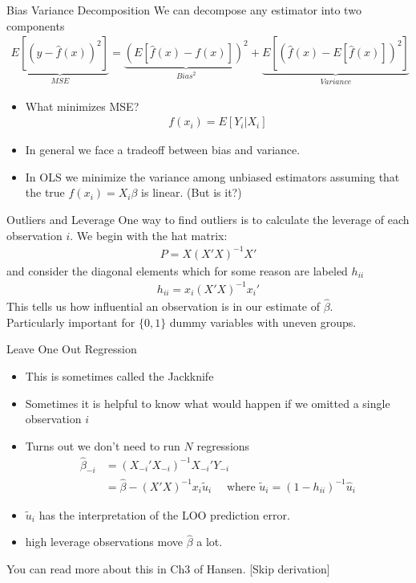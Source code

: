 \documentclass[aspectratio=169]{beamer}
\begin{document}
\begin{frame}{Bias Variance Decomposition}
We can decompose any estimator into two components
\begin{eqnarray*}
\underbrace{E[(y- \hat{f}(x))^2]}_{MSE} =\underbrace{\left( E[ \hat{f}(x) - f(x)] \right)^2}_{Bias^2}  +  \underbrace{E \left[ \left(  \hat{f}(x) - E[\hat{f}(x)]  \right)^2 \right]}_{Variance} 
\end{eqnarray*}
\begin{itemize}
\item What minimizes MSE?
\begin{eqnarray*}
f(x_i) = E[Y_i | X_i]  
\end{eqnarray*}
\item In general we face a tradeoff between bias and variance.
\item In OLS we minimize the variance among unbiased estimators assuming that the true $f(x_i)= X_i \beta$ is linear. (But is it?)
\end{itemize}
\end{frame}



\begin{frame}{Outliers and Leverage}
One way to find \alert{outliers} is to calculate the \alert{leverage} of each observation $i$. We begin with the \alert{hat matrix}:
\begin{align*}
P = X  (X'X)^{-1} X'
\end{align*}
and consider the diagonal elements which for some reason are labeled $h_{ii}$
\begin{align*}
h_{ii} = x_i (X'X)^{-1} x_i'
\end{align*}
This tells us how \alert{influential} an observation is in our estimate of $\widehat{\beta}$.\\
Particularly important for $\{0,1\}$ \alert{dummy variables} with uneven groups.
\end{frame}


\begin{frame}{Leave One Out Regression}
\begin{itemize}
\item This is sometimes called the \alert{Jackknife}
\item Sometimes it is helpful to know what would happen if we omitted a single observation $i$
\item Turns out we don't need to run $N$ regressions
\begin{align*}
\widehat{\beta}_{-i} &= (X_{-i}'X_{-i})^{-1} X_{-i}' Y_{-i} \\
&=\widehat{\beta} -  (X 'X)^{-1} x_i  \tilde{u}_i  \quad \mbox{ where } \tilde{u}_i = (1-h_{ii})^{-1}\hat{u}_i
\end{align*}
\item $\tilde{u}_i $ has the interpretation of the \alert{LOO prediction error}.
\item high leverage observations move $\widehat{\beta}$ a lot.
\end{itemize}
You can read more about this in Ch3 of Hansen. [Skip derivation]
\end{frame}
\end{document}
